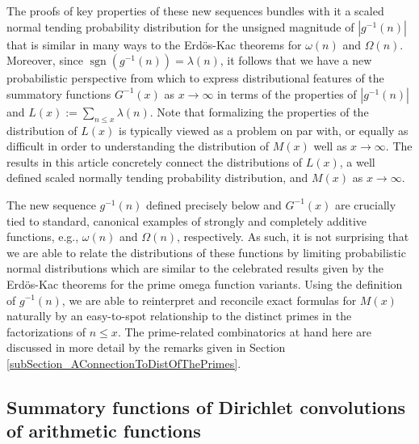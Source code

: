 \documentclass[11pt,reqno,a4letter]{article}
\numberwithin{figure}{section}
\numberwithin{table}{section}
\theoremstyle{plain}
\numberwithin{theorem}{section}
\theoremstyle{definition}
\begin{document}
The proofs of key properties of these new sequences 
bundles with it a scaled normal tending probability distribution for the unsigned 
magnitude of $|g^{-1}(n)|$ that is similar in many ways to the Erd\"{o}s-Kac theorems for 
$\omega(n)$ and $\Omega(n)$. 
Moreover, since $\operatorname{sgn}(g^{-1}(n)) = \lambda(n)$, it follows 
that we have a new probabilistic perspective from which to express distributional features of 
the summatory functions $G^{-1}(x)$ as $x \rightarrow \infty$ in terms of the properties of 
$|g^{-1}(n)|$ and $L(x) := \sum_{n \leq x} \lambda(n)$. 
Note that formalizing the properties of the distribution of 
$L(x)$ is typically viewed as a problem on par with, 
or equally as difficult in order to understanding the distribution of $M(x)$ well as 
$x \rightarrow \infty$. 
The results in this article concretely connect the distributions of $L(x)$, a well defined 
scaled normally tending probability distribution, and $M(x)$ as $x \rightarrow \infty$. 

The new sequence $g^{-1}(n)$ defined precisely below and 
$G^{-1}(x)$ are crucially tied to 
standard, canonical examples of strongly and completely additive functions, 
e.g., $\omega(n)$ and $\Omega(n)$, respectively. 
As such, it is not surprising that we are able to relate the distributions of these 
functions by limiting probabilistic normal distributions which are similar to the 
celebrated results given by the Erd\"os-Kac theorems for the prime omega function variants. 
Using the definition of $g^{-1}(n)$, 
we are able to reinterpret and reconcile exact formulas for $M(x)$ naturally by an easy-to-spot 
relationship to the distinct primes in the factorizations of $n \leq x$. 
The prime-related combinatorics at hand here are discussed in more detail by the remarks 
given in Section \ref{subSection_AConnectionToDistOfThePrimes}. 

\subsection{Summatory functions of Dirichlet convolutions of arithmetic functions} 
\end{document}
